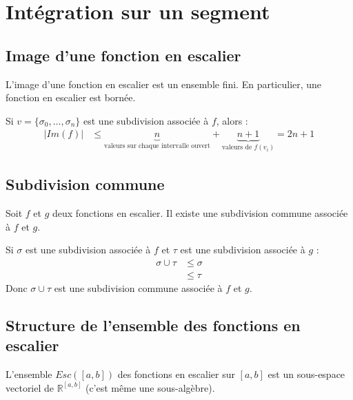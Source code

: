 \documentclass[../main.tex]{subfiles}
\begin{document}
\setcounter{chapter}{25}
\chapter{Intégration sur un segment}
\tableofcontents
\clearpage

\section{Image d'une fonction en escalier}
\begin{tcolorbox}[title=Propostion 26.12, title filled=false, colframe=lightblue, colback=lightblue!10!white]
    L'image d'une fonction en escalier est un ensemble fini. En particulier, une fonction en escalier est bornée. 
\end{tcolorbox}

\noindent Si $v = \{ \sigma_0, \ldots, \sigma_n \}$ est une subdivision associée à $f$, alors : 
\begin{align*}
    |Im(f)| &\leq \underbrace{n}_{\text{valeurs sur chaque intervalle ouvert}} + \underbrace{n + 1}_{\text{valeurs de } f(v_i)} = 2n + 1
\end{align*}

\section{Subdivision commune}
\begin{tcolorbox}[title=Lemme 26.14, title filled=false, colframe=orange, colback=orange!10!white]
    Soit $f$ et $g$ deux fonctions en escalier. Il existe une subdivision commune associée à $f$ et $g$. 
\end{tcolorbox}

\noindent Si $\sigma$ est une subdivision associée à $f$ et $\tau$ est une subdivision associée à $g$ : 
\begin{align*}
    \sigma \cup \tau &\leq \sigma \\
    &\leq \tau
\end{align*}
Donc $\sigma \cup \tau$ est une subdivision commune associée à $f$ et $g$.

\section{Structure de l'ensemble des fonctions en escalier}
\begin{tcolorbox}[title=Théorème 26.15, title filled=false, colframe=orange, colback=orange!10!white]
    L'ensemble $Esc([a,b])$ des fonctions en escalier sur $[a,b]$ est un sous-espace vectoriel de $\mathbb{R}^[a, b]$ (c'est même une sous-algèbre). 
\end{tcolorbox}
\end{document}

